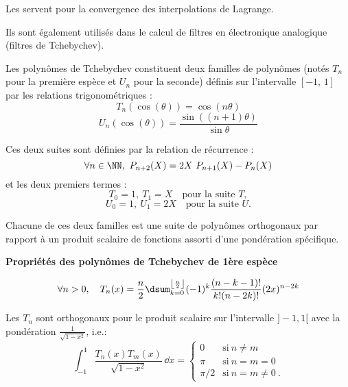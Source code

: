 Les  servent pour la convergence des interpolations de Lagrange.

Ils sont également utilisés dans le calcul de filtres en électronique analogique (filtres de Tchebychev).

\medskip
Les polynômes de Tchebychev 
constituent deux familles de polynômes (notés $T_n$ 
pour la première espèce et $U_n$ pour la seconde) définis sur l'intervalle $[-1,\, 1]$ par 
les relations trigonométriques :
\begin{equation}
    T_n(\cos(\theta))=\cos(n\theta)
\end{equation}
\begin{equation}
    U_n(\cos(\theta))=\frac{\sin((n+1) \theta)}{\sin \theta}
\end{equation}

Ces deux suites sont définies par la relation de récurrence :
\begin{equation}
    \forall n\in\NN,~P_{n+2}(X)=2X~P_{n+1}(X)-P_n(X)
\end{equation}
et les deux premiers termes :
\begin{equation}
    T_0=1,~T_1=X \quad \text{pour la suite } T,
\end{equation}
\begin{equation}
    U_0=1,~U_1=2X \quad \text{pour la suite } U.
\end{equation}

Chacune de ces deux familles est une suite de polynômes orthogonaux 
par rapport à un produit scalaire de fonctions assorti d'une pondération spécifique.

\medskip
\textbf{Propriétés des polynômes de Tchebychev de 1ère espèce}

\begin{equation}
\forall n>0, \quad
    T_n(x)=\dfrac n2\dsum_{k=0}^{\left\lfloor \frac n2\right\rfloor}(-1)^k \frac{(n-k-1)!}{k!(n-2k)!}(2x)^{n-2k}
\end{equation}

Les $T_n$ sont orthogonaux pour le produit scalaire sur l'intervalle $]-1,1[$ avec la 
pondération $\frac1{\sqrt{1-x^2}}$, i.e.:
\begin{equation}
    \int_{-1}^1 \frac{T_n(x)T_m(x)}{\sqrt{1-x^2}}\,\dd x= \begin{cases} 0&\text{si}~n\ne m\\ \pi&\text{si}~n=m=0\\ \pi/2&\text{si}~n=m\ne 0~. \end{cases} 
\end{equation}

